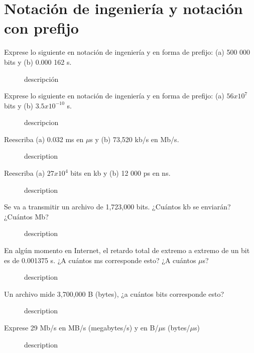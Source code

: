 
\section*{Notaci\'on de ingenier\'ia y notaci\'on con prefijo}

\begin{description}
	\item[Exprese lo siguiente en notación de ingeniería y en forma de prefijo: (a) 500 000 bits y (b) 0.000 162 s.] 
	descripción
	
	\item[Exprese lo siguiente en notación de ingeniería y en forma de prefijo: (a) $56x10^7$ bits y (b) $3.5x10^{-10}$ s.]
	descripcion
	
	\item[Reescriba (a) 0.032 ms en $\mu$s y (b) 73,520 kb/s en Mb/s.]
	description
	
	\item[Reescriba (a) $27x10^4$ bits en kb y (b) 12 000 ps en ns.]
	description
	
	\item[Se va a transmitir un archivo de 1,723,000 bits. ¿Cuántos kb se enviarán? ¿Cuántos Mb?] description
	
	\item[En algún momento en Internet, el retardo total de extremo a extremo de un bit es de 0.001375 s. ¿A cuántos ms corresponde esto? ¿A cuántos $\mu$s?]
	description
	
	\item[Un archivo mide 3,700,000 B (bytes), ¿a cuántos bits corresponde esto?]
	description
	
	\item[Exprese 29 Mb/s en MB/s (megabytes/s) y en B/$\mu$s (bytes/$\mu$s)] description
\end{description}